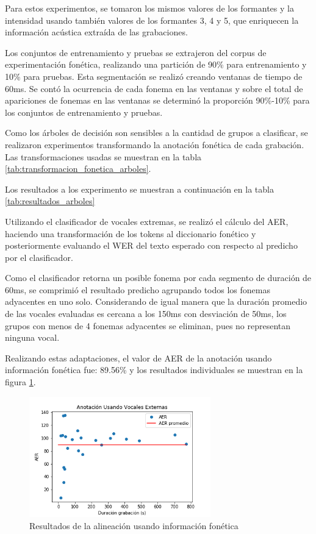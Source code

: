 Para estos experimentos, se tomaron los mismos valores de los formantes y la intensidad usando también valores de los formantes 3, 4 y 5, que enriquecen la información acústica extraída de las grabaciones.

Los conjuntos de entrenamiento y pruebas se extrajeron del corpus de experimentación fonética, realizando una partición de 90\% para entrenamiento y 10\% para pruebas. Esta segmentación se realizó creando ventanas de tiempo de 60ms. Se contó la ocurrencia de cada fonema en las ventanas y sobre el total de apariciones de fonemas en las ventanas se determinó la proporción 90\%-10\% para los conjuntos de entrenamiento y pruebas.

Como los árboles de decisión son sensibles a la cantidad de grupos a clasificar, se realizaron experimentos transformando la anotación fonética de cada grabación. Las transformaciones usadas se muestran en la tabla \ref{tab:transformacion_fonetica_arboles}.



Los resultados a los experimento se muestran a continuación en la tabla \ref{tab:resultados_arboles}



Utilizando el clasificador de vocales extremas, se realizó el cálculo del AER, haciendo una transformación de los tokens al diccionario fonético y posteriormente evaluando el WER del texto esperado con respecto al predicho por el clasificador.

Como el clasificador retorna un posible fonema por cada segmento de duración de 60ms, se comprimió el resultado predicho agrupando todos los fonemas adyacentes en uno solo. Considerando de igual manera que la duración promedio de las vocales evaluadas es cercana a los 150ms con desviación de 50ms, los grupos con menos de 4 fonemas adyacentes se eliminan, pues no representan ninguna vocal.

Realizando estas adaptaciones, el valor de AER de la anotación usando información fonética fue: 89.56\% y los resultados individuales se muestran en la figura \ref{img:aer_vocales_externas}.

\begin{figure}[H]
\caption{Resultados de la alineación usando información fonética}
\label{img:aer_vocales_externas}
\begin{center}
\includegraphics[width=0.7\textwidth]{imagenes/04_04_aer_vocales_externas.png}
\end{center}
\end{figure}

